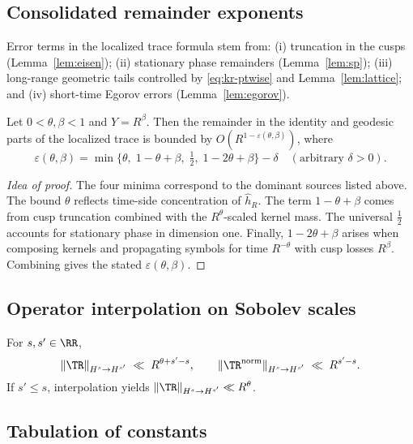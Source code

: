 \subsection{Consolidated remainder exponents}
\label{app:aux:exponents}

Error terms in the localized trace formula stem from:
(i) truncation in the cusps (Lemma~\ref{lem:eisen});
(ii) stationary phase remainders (Lemma~\ref{lem:sp});
(iii) long-range geometric tails controlled by \eqref{eq:kr-ptwise} and
Lemma~\ref{lem:lattice}; and
(iv) short-time Egorov errors (Lemma~\ref{lem:egorov}).

\begin{proposition}\label{prop:eps}
Let $0<\theta,\beta<1$ and $Y=R^\beta$.
Then the remainder in the identity and geodesic parts of the localized trace
is bounded by $O(R^{1-\varepsilon(\theta,\beta)})$, where
\[
\varepsilon(\theta,\beta)
=\min\{\theta,\; 1-\theta+\beta,\; \tfrac12,\; 1-2\theta+\beta\}-\delta
\quad(\text{arbitrary }\delta>0).
\]
\end{proposition}

\begin{proof}[Idea of proof]
The four minima correspond to the dominant sources listed above.
The bound $\theta$ reflects time-side concentration of $\widehat h_R$.
The term $1-\theta+\beta$ comes from cusp truncation combined with the
$R^\theta$-scaled kernel mass.
The universal $\tfrac12$ accounts for stationary phase in dimension one.
Finally, $1-2\theta+\beta$ arises when composing kernels and propagating
symbols for time $R^{-\theta}$ with cusp losses $R^{\beta}$.
Combining gives the stated $\varepsilon(\theta,\beta)$.
\end{proof}

\subsection{Operator interpolation on Sobolev scales}
\label{app:aux:interp}

\begin{lemma}
For $s,s'\in\RR$,
\[
\|\TR\|_{H^s\to H^{s'}} \;\ll\; R^{\theta+s'-s},
\qquad
\|\TR^{\mathrm{norm}}\|_{H^s\to H^{s'}} \;\ll\; R^{s'-s}.
\]
If $s'\le s$, interpolation yields $\|\TR\|_{H^s\to H^{s'}}\ll R^\theta$.
\end{lemma}

\subsection{Tabulation of constants}
\label{app:aux:constants}

